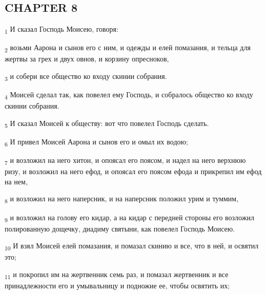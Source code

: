 \subsection{CHAPTER 8}
\begin{tcolorbox}
\textsubscript{1} И сказал Господь Моисею, говоря:
\end{tcolorbox}
\begin{tcolorbox}
\textsubscript{2} возьми Аарона и сынов его с ним, и одежды и елей помазания, и тельца для жертвы за грех и двух овнов, и корзину опресноков,
\end{tcolorbox}
\begin{tcolorbox}
\textsubscript{3} и собери все общество ко входу скинии собрания.
\end{tcolorbox}
\begin{tcolorbox}
\textsubscript{4} Моисей сделал так, как повелел ему Господь, и собралось общество ко входу скинии собрания.
\end{tcolorbox}
\begin{tcolorbox}
\textsubscript{5} И сказал Моисей к обществу: вот что повелел Господь сделать.
\end{tcolorbox}
\begin{tcolorbox}
\textsubscript{6} И привел Моисей Аарона и сынов его и омыл их водою;
\end{tcolorbox}
\begin{tcolorbox}
\textsubscript{7} и возложил на него хитон, и опоясал его поясом, и надел на него верхнюю ризу, и возложил на него ефод, и опоясал его поясом ефода и прикрепил им ефод на нем,
\end{tcolorbox}
\begin{tcolorbox}
\textsubscript{8} и возложил на него наперсник, и на наперсник положил урим и туммим,
\end{tcolorbox}
\begin{tcolorbox}
\textsubscript{9} и возложил на голову его кидар, а на кидар с передней стороны его возложил полированную дощечку, диадиму святыни, как повелел Господь Моисею.
\end{tcolorbox}
\begin{tcolorbox}
\textsubscript{10} И взял Моисей елей помазания, и помазал скинию и все, что в ней, и освятил это;
\end{tcolorbox}
\begin{tcolorbox}
\textsubscript{11} и покропил им на жертвенник семь раз, и помазал жертвенник и все принадлежности его и умывальницу и подножие ее, чтобы освятить их;
\end{tcolorbox}

